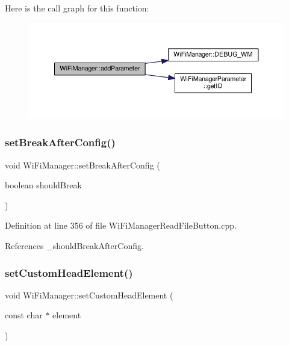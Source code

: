 Here is the call graph for this function\+:
\nopagebreak
\begin{figure}[H]
\begin{center}
\leavevmode
\includegraphics[width=350pt]{d4/dc8/class_wi_fi_manager_a62907428e5874de097d83c33ef46c80d_cgraph}
\end{center}
\end{figure}
\mbox{\label{class_wi_fi_manager_ad48fd74c893d12778121fa239d245cc9}} 
\subsubsection{\texorpdfstring{set\+Break\+After\+Config()}{setBreakAfterConfig()}}
{\footnotesize\ttfamily void Wi\+Fi\+Manager\+::set\+Break\+After\+Config (\begin{DoxyParamCaption}\item[{boolean}]{should\+Break }\end{DoxyParamCaption})}



Definition at line 356 of file Wi\+Fi\+Manager\+Read\+File\+Button.\+cpp.



References \+\_\+should\+Break\+After\+Config.

\mbox{\label{class_wi_fi_manager_a85570bcfe03da48c4be75b8e4302c4db}} 
\subsubsection{\texorpdfstring{set\+Custom\+Head\+Element()}{setCustomHeadElement()}}
{\footnotesize\ttfamily void Wi\+Fi\+Manager\+::set\+Custom\+Head\+Element (\begin{DoxyParamCaption}\item[{const char $\ast$}]{element }\end{DoxyParamCaption})}



